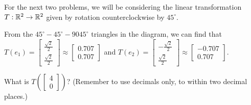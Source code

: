 \endedxvertical








For the next two problems, we will be considering the linear transformation $T: \mathbb R^2 \rightarrow \mathbb R^2$
given by rotation counterclockwise by $45^\circ$.  


\begin{center}
 

\end{center}


From the $45^\circ-45^\circ-9045^\circ$ triangles in the diagram, we can find that  
$T(e_1) = \left[ \begin{array}{c} \frac{\sqrt{2}}{2} \\ \frac{\sqrt{2}}{2}  \end{array} \right] \approx
\left[ \begin{array}{c} 0.707 \\ 0.707 \end{array} \right]$ and
$T(e_2) = \left[ \begin{array}{c} -\frac{\sqrt{2}}{2} \\ \frac{\sqrt{2}}{2}  \end{array} \right] \approx
\left[ \begin{array}{c} -0.707 \\ 0.707  \end{array} \right].$   

What is $T\left( \left[ \begin{array}{c} 4 \\ 0 \end{array} \right] \right)$?  (Remember to use decimals only, to within two decimal places.)  








